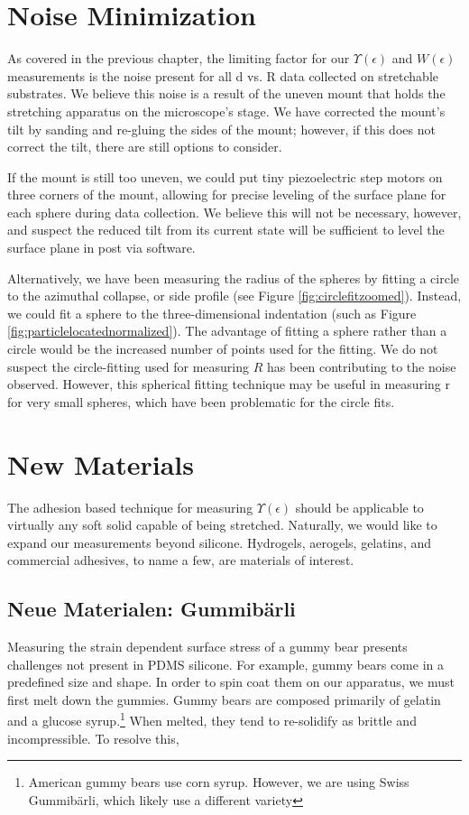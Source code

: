 \section{Noise Minimization}
As covered in the previous chapter, the limiting factor for our $ \Upsilon(\epsilon) $ and $ W(\epsilon) $ measurements is the noise present for all d vs. R data collected on stretchable substrates. We believe this noise is a result of the uneven mount that holds the stretching apparatus on the microscope's stage. We have corrected the mount's tilt by sanding and re-gluing the sides of the mount; however, if this does not correct the tilt, there are still options to consider. 

If the mount is still too uneven, we could put tiny piezoelectric step motors on three corners of the mount, allowing for precise leveling of the surface plane for each sphere during data collection. We believe this will not be necessary, however, and suspect the reduced tilt from its current state will be sufficient to level the surface plane in post via software.

Alternatively, we have been measuring the radius of the spheres by fitting a circle to the azimuthal collapse, or side profile (see Figure \ref{fig:circlefitzoomed}). Instead, we could fit a sphere to the three-dimensional indentation (such as Figure \ref{fig:particlelocatednormalized}). The advantage of fitting a sphere rather than a circle would be the increased number of points used for the fitting. We do not suspect the circle-fitting used for measuring $ R $ has been contributing to the noise observed. However, this spherical fitting technique may be useful in measuring r for very small spheres, which have been problematic for the circle fits.    


\section{New Materials}
The adhesion based technique for measuring $\Upsilon(\epsilon)$ should be applicable to virtually any soft solid capable of being stretched. Naturally, we would like to expand our measurements beyond silicone. Hydrogels, aerogels, gelatins, and commercial adhesives, to name a few, are materials of interest. 
\subsection{Neue Materialen: Gummibärli}
Measuring the strain dependent surface stress of a gummy bear presents challenges not present in PDMS silicone. For example, gummy bears come in a predefined size and shape. In order to spin coat them on our apparatus, we must first melt down the gummies. Gummy bears are composed primarily of gelatin and a glucose syrup.\footnote{American gummy bears use corn syrup. However, we are using Swiss  Gummibärli, which likely use a different variety}  When melted, they tend to re-solidify as brittle and incompressible. To resolve this, 
  
